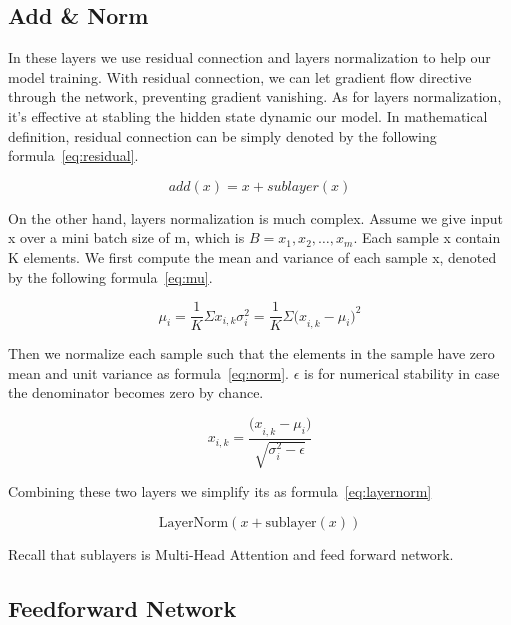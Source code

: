 \documentclass{article}
\begin{document}
\subsection{Add \& Norm}

In these layers we use residual connection and layers normalization to
help our model training. With residual connection,
we can let gradient flow directive through the network,
preventing gradient vanishing. As for layers normalization,
it’s effective at stabling the hidden state dynamic our model.
In mathematical definition, residual connection can be simply denoted
by the following formula~\ref{eq:residual}.

\begin{equation}
    \label{eq:residual}
    add(x)=x+sublayer(x)
\end{equation}

On the other hand, layers normalization is much complex.
Assume we give input x over a mini batch size of m,
which is $B={x_1, x_2, \ldots, x_m}$. Each sample x contain K elements.
We first compute the mean and variance of each sample x,
denoted by the following formula~\ref{eq:mu}.

\begin{equation}
    \label{eq:mu}
    \mu_i=
    \frac{1}{K}\Sigma x_{i,k}\sigma_i^2=
    \frac{1}{K}\Sigma{{(x}_{i,k}-\mu_i)}^2
\end{equation}

Then we normalize each sample such that the elements in the sample
have zero mean and unit variance as formula~\ref{eq:norm}.
$\epsilon$ is for numerical stability
in case the denominator becomes zero by chance.

\begin{equation}
    \label{eq:norm}
    x_{i,k}=\frac{{(x}_{i,k}-\mu_i)}{\sqrt{\sigma_i^2-\epsilon}}
\end{equation}

Combining these two layers we simplify its as formula~\ref{eq:layernorm}

\begin{equation}
    \label{eq:layernorm}
    \textrm{LayerNorm}\left(x+\textrm{sublayer}(x)\right)
\end{equation}

Recall that sublayers is Multi-Head Attention and feed forward network.

\subsection{Feedforward Network}
\end{document}
